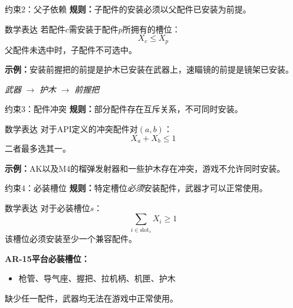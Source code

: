 \documentclass[aspectratio=169]{beamer}
\begin{document}
\begin{frame}{约束2：父子依赖}
    \textbf{规则：}子配件的安装必须以父配件已安装为前提。

    \vspace{0.3cm}
    \begin{block}{数学表达}
        若配件$c$需安装于配件$p$所拥有的槽位：
        \[
        X_c \le X_p
        \]
        父配件未选中时，子配件不可选中。
    \end{block}

    \vspace{0.3cm}
    \textbf{示例：}安装前握把的前提是护木已安装在武器上，速瞄镜的前提是镜架已安装。

    \vspace{0.2cm}
    \begin{center}
    \textit{武器} $\to$ \textit{护木} $\to$ \textit{前握把}
    \end{center}
\end{frame}

\begin{frame}{约束3：配件冲突}
    \textbf{规则：}部分配件存在互斥关系，不可同时安装。

    \vspace{0.3cm}
    \begin{block}{数学表达}
        对于API定义的冲突配件对$(a, b)$：
        \[
        X_a + X_b \le 1
        \]
        二者最多选其一。
    \end{block}

    \vspace{0.3cm}
    \textbf{示例：}AK以及M4的榴弹发射器和一些护木存在冲突，游戏不允许同时安装。
\end{frame}

\begin{frame}{约束4：必装槽位}
    \textbf{规则：}特定槽位\textit{必须}安装配件，武器才可以正常使用。

    \vspace{0.3cm}
    \begin{block}{数学表达}
        对于必装槽位$s$：
        \[
        \sum_{i \in \text{slot}_s} X_i \ge 1
        \]
        该槽位必须安装至少一个兼容配件。
    \end{block}

    \vspace{0.3cm}
    \textbf{AR-15平台必装槽位：}
    \begin{itemize}
        \item 枪管、导气座、握把、拉机柄、机匣、护木
    \end{itemize}

    \vspace{0.2cm}
    缺少任一配件，武器均无法在游戏中正常使用。
\end{frame}
\end{document}
